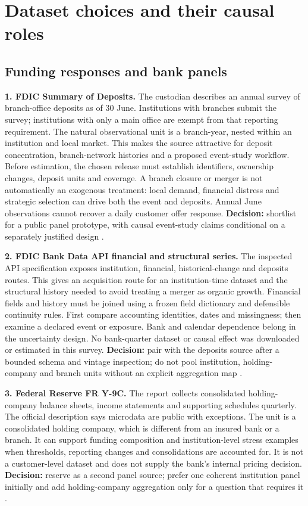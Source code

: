 \hypertarget{pd15:datasets}{%
\chapter{Dataset choices and their causal roles}\label{pd15:datasets}}

\hypertarget{funding-responses-and-bank-panels}{%
\section{Funding responses and bank
panels}\label{funding-responses-and-bank-panels}}

\textbf{1. FDIC Summary of Deposits.} The custodian describes an annual
survey of branch-office deposits as of 30 June. Institutions with
branches submit the survey; institutions with only a main office are
exempt from that reporting requirement. The natural observational unit
is a branch-year, nested within an institution and local market. This
makes the source attractive for deposit concentration, branch-network
histories and a proposed event-study workflow. Before estimation, the
chosen release must establish identifiers, ownership changes, deposit
units and coverage. A branch closure or merger is not automatically an
exogenous treatment: local demand, financial distress and strategic
selection can drive both the event and deposits. Annual June
observations cannot recover a daily customer offer response.
\textbf{Decision:} shortlist for a public panel prototype, with causal
event-study claims conditional on a separately justified design
\citep{pd15_fdic_sod}.

\textbf{2. FDIC Bank Data API financial and structural series.} The
inspected API specification exposes institution, financial,
historical-change and deposits routes. This gives an acquisition route
for an institution-time dataset and the structural history needed to
avoid treating a merger as organic growth. Financial fields and history
must be joined using a frozen field dictionary and defensible continuity
rules. First compare accounting identities, dates and missingness; then
examine a declared event or exposure. Bank and calendar dependence
belong in the uncertainty design. No bank-quarter dataset or causal
effect was downloaded or estimated in this survey. \textbf{Decision:}
pair with the deposits source after a bounded schema and vintage
inspection; do not pool institution, holding-company and branch units
without an explicit aggregation map \citep{pd15_fdic_api_spec}.

\textbf{3. Federal Reserve FR Y-9C.} The report collects consolidated
holding-company balance sheets, income statements and supporting
schedules quarterly. The official description says microdata are public
with exceptions. The unit is a consolidated holding company, which is
different from an insured bank or a branch. It can support funding
composition and institution-level stress examples when thresholds,
reporting changes and consolidations are accounted for. It is not a
customer-level dataset and does not supply the bank's internal pricing
decision. \textbf{Decision:} reserve as a second panel source; prefer
one coherent institution panel initially and add holding-company
aggregation only for a question that requires it \citep{pd15_y9c}.

